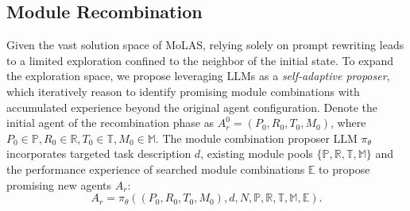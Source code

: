 \subsection{Module Recombination}
Given the vast solution space of MoLAS, relying solely on prompt rewriting leads to a limited exploration confined to the neighbor of the initial state.
To expand the exploration space, we propose leveraging LLMs as a \emph{self-adaptive proposer}, which iteratively reason to identify promising module combinations with accumulated experience beyond the original agent configuration.
Denote the initial agent of the recombination phase as $A_r^0 = (P_0,R_0,T_0,M_0)$, where $P_0 \in \mathbb{P}, R_0 \in \mathbb{R}, T_0 \in \mathbb{T}, M_0 \in \mathbb{M}$.
The module combination proposer LLM $\pi_{\theta}$ incorporates targeted task description $d$, existing module pools $\{\mathbb{P}, \mathbb{R}, \mathbb{T}, \mathbb{M}\}$ and the performance experience of searched module combinations $\mathbb{E}$ to propose promising new agents $A_r$:
\begin{equation}
    A_r = \pi_{\theta}((P_0,R_0,T_0,M_0), d, N, \mathbb{P}, \mathbb{R}, \mathbb{T}, \mathbb{M}, \mathbb{E}).
\end{equation}

